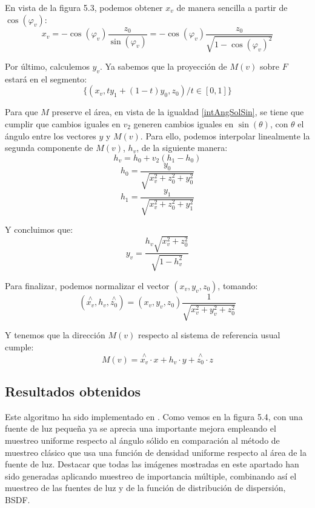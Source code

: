 En vista de la figura 5.3, podemos obtener $x_v$ de manera sencilla a partir de $\cos(\varphi_v)$:
$$x_v = -\cos(\varphi_v)\frac{z_0}{\sin(\varphi_v)} = -\cos(\varphi_v)\frac{z_0}{\sqrt{1-\cos(\varphi_v)^2}} $$

Por último, calculemos $y_v$. Ya sabemos que la proyección de $M(v)$ sobre $F$ estará en el segmento:
$$\{(x_v, t y_1 + (1-t) y_0, z_0) / t\in [0,1]\}$$

Para que $M$ preserve el área, en vista de la igualdad \ref{intAngSolSin}, se tiene que cumplir que cambios iguales en $v_2$ generen cambios iguales en $\sin(\theta)$, con $\theta$ el ángulo entre los vectores $y$ y $M(v)$. Para ello, podemos interpolar linealmente la segunda componente de $M(v)$, $h_v$, de la siguiente manera:
$$h_v = h_0 + v_2(h_1-h_0) $$
$$h_0=\frac{y_0}{\sqrt{x_v^2+z_0^2+y_0^2}} $$
$$h_1=\frac{y_1}{\sqrt{x_v^2+z_0^2+y_1^2}}$$

Y concluimos que:
$$y_v = \frac{h_v \sqrt{x_v^2+z_0^2}}{\sqrt{1-h_v^2}}$$

Para finalizar, podemos normalizar el vector $(x_v, y_v, z_0)$, tomando:
$$(\overset{\wedge}{x_v}, h_v, \overset{\wedge}{z_0}) = (x_v, y_v, z_0)\frac{1}{\sqrt{x_v^2 + y_v^2 + z_0^2}}$$

Y tenemos que la dirección $M(v)$ respecto al sistema de referencia usual cumple:
$$M(v) = \overset{\wedge}{x_v} \cdot x + h_v\cdot y + \overset{\wedge}{z_0}\cdot z $$

\subsection{Resultados obtenidos}

Este algoritmo ha sido implementado en \cite{pbrtCode}. Como vemos en la figura 5.4, con una fuente de luz pequeña ya se aprecia una importante mejora empleando el muestreo uniforme respecto al ángulo sólido en comparación al método de muestreo clásico que usa una función de densidad uniforme respecto al área de la fuente de luz. Destacar que todas las imágenes mostradas en este apartado han sido generadas aplicando muestreo de importancia múltiple, combinando así el muestreo de las fuentes de luz y de la función de distribución de dispersión, BSDF.

